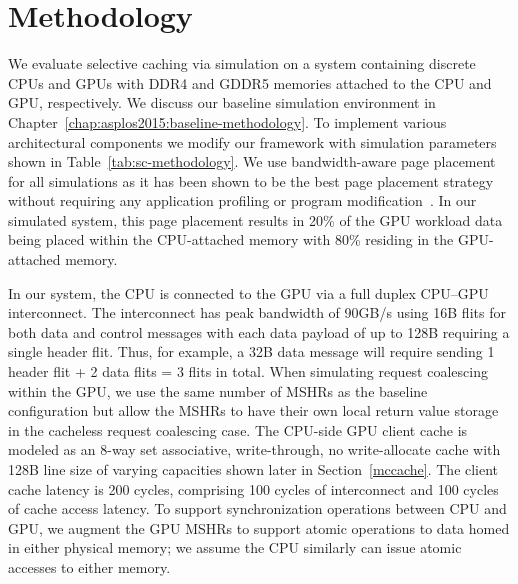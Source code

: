 \vspace{-.05in}
\section{Methodology}
\label{methodology}

We evaluate selective caching via simulation on a system containing discrete
CPUs and GPUs with DDR4 and GDDR5 memories attached to the CPU and GPU,
respectively.  We discuss our baseline simulation environment in
Chapter~\ref{chap:asplos2015:baseline-methodology}.  To implement various architectural components
we modify our framework with simulation parameters shown in
Table~\ref{tab:sc-methodology}.  We use bandwidth-aware page placement for all
simulations as it has been shown to be the best page placement strategy without
requiring any application profiling or program modification~\cite{Agarwal2015}.
In our simulated system, this page placement results in 20\% of the GPU workload
data being placed within the CPU-attached memory with 80\% residing in the
GPU-attached memory.  

In our system, the CPU is connected to the GPU via a full duplex CPU--GPU
interconnect. The interconnect has peak bandwidth of 90GB/s using 16B flits for
both data and control messages with each data payload of up to 128B requiring a
single header flit.  Thus, for example, a 32B data message will require sending
1 header flit + 2 data flits = 3 flits in total.
When simulating request coalescing within the GPU, we use the same number of
MSHRs as the baseline configuration but allow the MSHRs to have their own local
return value storage in the cacheless request coalescing case.  The CPU-side GPU
client cache is modeled as an 8-way set associative, write-through, no
write-allocate cache with 128B line size of varying capacities shown later in
Section~\ref{mccache}. The client cache latency is 200 cycles, comprising 100
cycles of interconnect and 100 cycles of cache access latency.  To support
synchronization operations between CPU and GPU, we augment the GPU MSHRs to
support atomic operations to data homed in either physical memory; we assume the
CPU similarly can issue atomic accesses to either memory.

